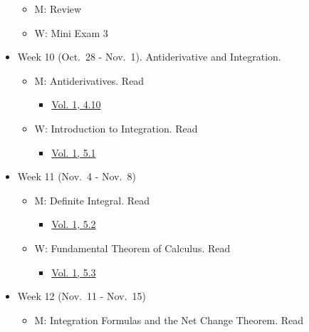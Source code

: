 \documentclass[
]{article}
\providecommand{\tightlist}{%
  \setlength{\itemsep}{0pt}\setlength{\parskip}{0pt}}
\begin{document}
\begin{itemize}
  \begin{itemize}
  \tightlist
  \item
    M: Review
  \item
    W: Mini Exam 3
  \end{itemize}
\item
  Week 10 (Oct.~28 - Nov.~1). Antiderivative and Integration.

  \begin{itemize}
  \tightlist
  \item
    M: Antiderivatives. Read

    \begin{itemize}
    \tightlist
    \item
      \href{https://openstax.org/books/calculus-volume-1/pages/4-10-antiderivatives}{Vol. 1, 4.10}
    \end{itemize}
  \item
    W: Introduction to Integration. Read

    \begin{itemize}
    \tightlist
    \item
      \href{https://openstax.org/books/calculus-volume-1/pages/5-1-approximating-areas}{Vol. 1, 5.1}
    \end{itemize}
  \end{itemize}
\item
  Week 11 (Nov.~4 - Nov.~8)

  \begin{itemize}
  \tightlist
  \item
    M: Definite Integral. Read

    \begin{itemize}
    \tightlist
    \item
      \href{https://openstax.org/books/calculus-volume-1/pages/5-2-the-definite-integral}{Vol. 1, 5.2}
    \end{itemize}
  \item
    W: Fundamental Theorem of Calculus. Read

    \begin{itemize}
    \tightlist
    \item
      \href{https://openstax.org/books/calculus-volume-1/pages/5-3-the-fundamental-theorem-of-calculus}{Vol. 1, 5.3}
    \end{itemize}
  \end{itemize}
\item
  Week 12 (Nov.~11 - Nov.~15)

  \begin{itemize}
  \tightlist
  \item
    M: Integration Formulas and the Net Change Theorem. Read


\end{itemize}
\end{itemize}
\end{document}
